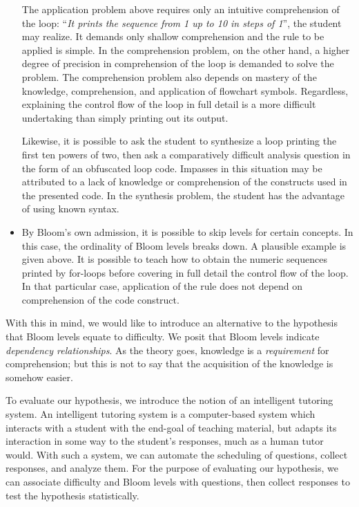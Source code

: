 \documentclass[a4paper,twocolumn]{article}
\begin{document}
\begin{itemize}
The application problem above requires only an intuitive comprehension of the
loop: ``\emph{It prints the sequence from 1 up to 10 in steps of 1}'', the
student may realize.  It demands only shallow comprehension and the rule to be
applied is simple.  In the comprehension problem, on the other hand, a higher
degree of precision in comprehension of the loop is demanded to solve the
problem.  The comprehension problem also depends on mastery of the knowledge,
comprehension, and application of flowchart symbols.  Regardless, explaining
the control flow of the loop in full detail is a more difficult undertaking
than simply printing out its output. 

Likewise, it is possible to ask the student to synthesize a loop printing the
first ten powers of two, then ask a comparatively difficult analysis question
in the form of an obfuscated loop code.  Impasses in this situation may be
attributed to a lack of knowledge or comprehension of the constructs used in
the presented code.  In the synthesis problem, the student has the advantage
of using known syntax. 

\item By Bloom's own admission, it is possible to skip levels for certain
concepts.  In this case, the ordinality of Bloom levels breaks down.  A
plausible example is given above.  It is possible to teach how to obtain the
numeric sequences printed by for-loops before covering in full detail the
control flow of the loop.  In that particular case, application of the rule
does not depend on comprehension of the code construct.

\end{itemize}

With this in mind, we would like to introduce an alternative to the hypothesis
that Bloom levels equate to difficulty.  We posit that Bloom levels indicate
\emph{dependency relationships}.  As the theory goes, knowledge is a
\emph{requirement} for comprehension; but this is not to say that the
acquisition of the knowledge is somehow easier.  

To evaluate our hypothesis, we introduce the notion of an intelligent tutoring
system.  An intelligent tutoring system is a computer-based system which
interacts with a student with the end-goal of teaching material, but adapts its
interaction in some way to the student's responses, much as a human tutor
would.  With such a system, we can automate the scheduling of questions,
collect responses, and analyze them. For the purpose of evaluating our
hypothesis, we can associate difficulty and Bloom levels with questions, then
collect responses to test the hypothesis statistically.
\end{document}
